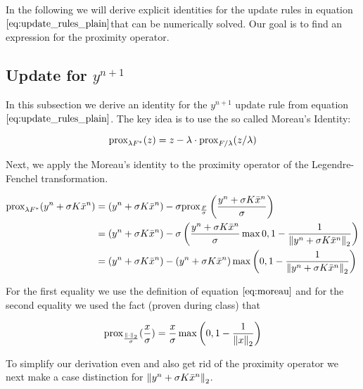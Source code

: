 In the following we will derive explicit identities for the update rules in equation $\ref{eq:update_rules_plain}$that can be numerically solved. Our goal is to find an expression for the proximity operator.

\subsection{Update for $y^{n+1}$}

In this subsection we derive an identity for the $y^{n+1}$ update rule from equation $\ref{eq:update_rules_plain}$. The key idea is to use the so called Moreau's Identity:  

\begin{equation}
	\text{prox}_{\lambda F^*}(z) = z - \lambda \cdot \text{prox}_{F/ \lambda}(z / \lambda) 
\label{eq:moreau}	
\end{equation}

Next, we apply the Moreau's identity to the proximity operator of the Legendre-Fenchel transformation.


\begin{align}
	\text{prox}_{\lambda F^*}(y^n + \sigma K \bar{x}^{n}) 
	&= (y^n + \sigma K \bar{x}^{n}) - \sigma \text{prox}_{\frac{F}{\sigma} } \left(\frac{y^n + \sigma K \bar{x}^{n} }{\sigma} \right) \nonumber \\
	&= (y^n + \sigma K \bar{x}^{n}) - \sigma \left( \frac{y^n + \sigma K \bar{x}^{n} }{\sigma} \max{0, 1-\frac{1}{\left\lVert y^n + \sigma K \bar{x}^{n} \right\rVert_2}} \right) \nonumber \\
	&= (y^n + \sigma K \bar{x}^{n}) - \left( y^n + \sigma K \bar{x}^{n} \right) \max{\left(0, 1-\frac{1}{\left\lVert y^n + \sigma K \bar{x}^{n} \right\rVert_2}\right)}  
\label{eq:y_n_1_expression}
\end{align}

For the first equality we use the definition of equation $\ref{eq:moreau}$ and for the second equality we used the fact (proven during class) that

\begin{align}
	\text{prox}_{\frac{\left\lVert\cdot\right\rVert_2}{\sigma}}(\frac{x}{\sigma}) = \frac{x}{\sigma} \max{\left(0, 1-\frac{1}{\left\lVert x\right\rVert_2}\right)}
\end{align}

To simplify our derivation even and also get rid of the proximity operator we next make a case distinction for $\left\lVert y^n + \sigma K \bar{x}^{n}\right\rVert_2$. 

